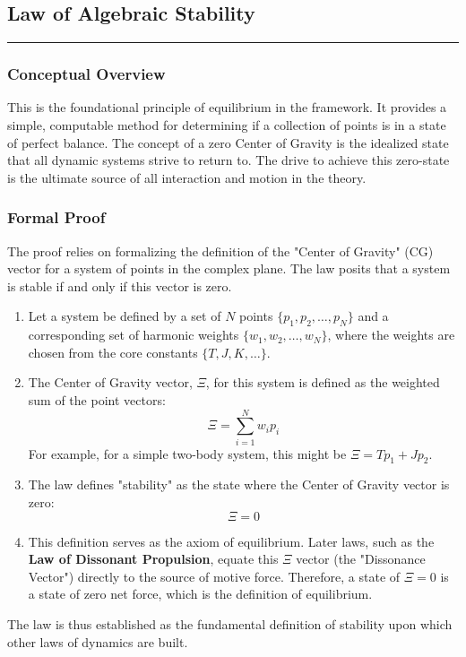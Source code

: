 
\subsection*{Law of Algebraic Stability}
\hrule
\vspace{0.3cm}
\vspace{0.5cm}

\subsubsection*{Conceptual Overview}
This is the foundational principle of equilibrium in the framework. It provides a simple, computable method for determining if a collection of points is in a state of perfect balance. The concept of a zero Center of Gravity is the idealized state that all dynamic systems strive to return to. The drive to achieve this zero-state is the ultimate source of all interaction and motion in the theory.

\subsubsection*{Formal Proof}
The proof relies on formalizing the definition of the "Center of Gravity" (CG) vector for a system of points in the complex plane. The law posits that a system is stable if and only if this vector is zero.

\begin{enumerate}
    \item Let a system be defined by a set of $N$ points $\{p_1, p_2, \dots, p_N\}$ and a corresponding set of harmonic weights $\{w_1, w_2, \dots, w_N\}$, where the weights are chosen from the core constants $\{T, J, K, \dots\}$.

    \item The Center of Gravity vector, $\Xi$, for this system is defined as the weighted sum of the point vectors:
    $$ \Xi = \sum_{i=1}^{N} w_i p_i $$
    For example, for a simple two-body system, this might be $\Xi = T p_1 + J p_2$.

    \item The law defines "stability" as the state where the Center of Gravity vector is zero:
    $$ \Xi = 0 $$
    
    \item This definition serves as the axiom of equilibrium. Later laws, such as the \textbf{Law of Dissonant Propulsion}, equate this $\Xi$ vector (the "Dissonance Vector") directly to the source of motive force. Therefore, a state of $\Xi = 0$ is a state of zero net force, which is the definition of equilibrium.
\end{enumerate}
The law is thus established as the fundamental definition of stability upon which other laws of dynamics are built.

